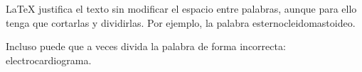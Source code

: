 \documentclass{article}
\begin{document}
\LaTeX{} justifica el texto sin modi\-ficar el espacio entre palabras, 
aunque para ello tenga que cortarlas y dividirlas. Por ejemplo, la 
palabra esternocleidomastoideo.

Incluso puede que a veces divida la palabra de forma incorrecta: 
electrocardiograma.
\end{document}

